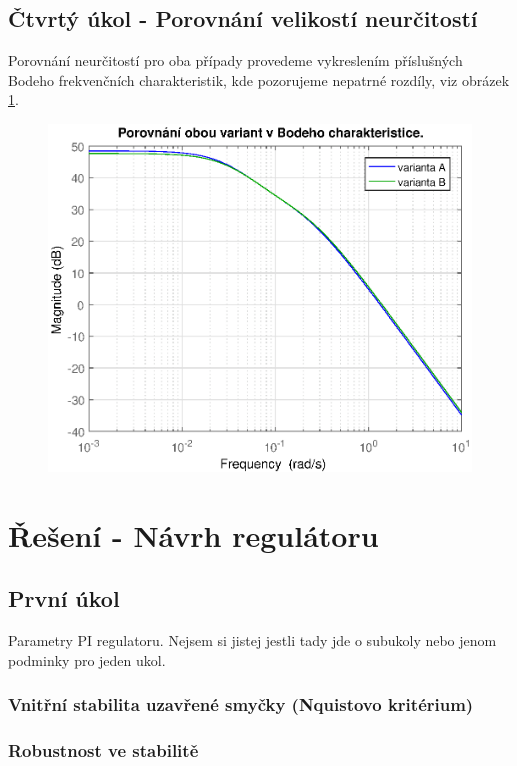 \documentclass[a4paper,11pt]{article}
\begin{document}
\subsection{Čtvrtý úkol - Porovnání velikostí neurčitostí}
Porovnání neurčitostí pro oba případy provedeme vykreslením příslušných Bodeho frekvenčních charakteristik, kde pozorujeme nepatrné rozdíly, viz obrázek \ref{fig:porovnani_neurcitosti}.
\begin{figure}[htbp]
	\begin{center}
	\includegraphics[scale = 1.0]{obrazky/porovnaniNeurcitosti.eps}
	\label{fig:porovnani_neurcitosti}
	\end{center}
\end{figure}


\newpage
\section{Řešení - Návrh regulátoru}
\subsection{První úkol}
Parametry PI regulatoru. Nejsem si jistej jestli tady jde o subukoly nebo jenom podminky pro jeden ukol.
\subsubsection{Vnitřní stabilita uzavřené smyčky (Nquistovo kritérium)}
\subsubsection{Robustnost ve stabilitě}
\end{document}
